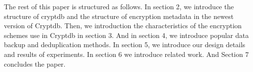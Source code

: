 The rest of this paper is structured as follows. In section 2, we introduce the structure of cryptdb and the structure of encryption metadata in the newest version of Cryptdb. Then, we introduction the characteristics of the encryption schemes use in Cryptdb in section 3. And in section 4, we introduce popular data backup and deduplication methods. In section 5, we introduce our design details and results of experiments. In section 6 we introduce related work. And Section 7 concludes the paper.
\\ \\ \\ 



